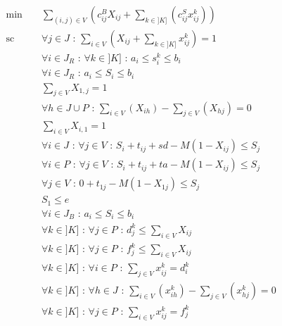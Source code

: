 \documentclass[12pt,a4paper,fleqn]{article}
\begin{document}
\begin{align}
& \text{min } && \sum \limits_{(i,j) \in V} (c^B_{ij}X_{ij} + \sum \limits_{k \in ]K]}( c^S_{ij}x^k_{ij})) \\[10pt]
& \text{sc }  && \forall j \in J \text{ : } \sum \limits_{i \in V}( X_{ij} + \sum \limits_{k \in ]K]} x^k_{ij} ) = 1 \label{tousservis} \\
& && \forall i \in J_R \text{ : } \forall k \in ]K] \text{ : } a_i \leqslant s_i^k \leqslant b_i \label{fenetrerestant1} \\
& && \forall i \in J_R \text{ : } a_i \leqslant S_i \leqslant b_i \label{fenetrerestant2} \\[30pt]
& && \sum \limits_{j \in V} X_{1,j} = 1 \label{partirdudepot} \\
& && \forall h \in J \cup P \text{ : } \sum \limits_{i \in V} (X_{ih}) - \sum \limits_{j \in V} (X_{hj}) = 0 \label{flotgros} \\
& && \sum \limits_{i \in V} X_{i,1} = 1 \label{reveniraudepot} \\
& && \forall i \in J \text{ : } \forall j \in V \text{ : } S_i + t_{ij} + sd - M(1-X_{ij}) \leqslant S_j \label{sequentialitegros1} \\
& && \forall i \in P \text{ : } \forall j \in V \text{ : } S_i + t_{ij} + ta - M(1-X_{ij}) \leqslant S_j \label{sequentialitegros2} \\
& && \forall j \in V \text{ : } 0 + t_{1j} - M(1-X_{1j}) \leqslant S_j \label{sequentialitegros3} \\
& && S_{1} \leqslant e \label{findejournee} \\
& && \forall i \in J_B \text{ : } a_i \leqslant S_i \leqslant b_i \label{fenetregros} \\[30pt]
& && \forall k \in ]K] \text{ : } \forall j \in P \text{ : } d^k_j \leqslant \sum \limits_{i \in V} X_{ij} \label{separationvalide} \\
& && \forall k \in ]K] \text{ : } \forall j \in P \text{ : } f^k_j \leqslant \sum \limits_{i \in V} X_{ij} \label{mergevalide} \\
& && \forall k \in ]K] \text{ : } \forall i \in P \text{ : } \sum \limits_{j \in V} x^k_{ij} = d^k_i \label{partirdugros} \\
& && \forall k \in ]K] \text{ : } \forall h \in J \text{ : } \sum \limits_{i \in V} (x_{ih}^k) - \sum \limits_{j \in V} (x_{hj}^k) = 0 \label{flotpetit} \\
& && \forall k \in ]K] \text{ : } \forall j \in P \text{ : } \sum \limits_{i \in V} x^k_{ij} = f^k_j \label{reveniraugros} \\

\end{align}
\end{document}
